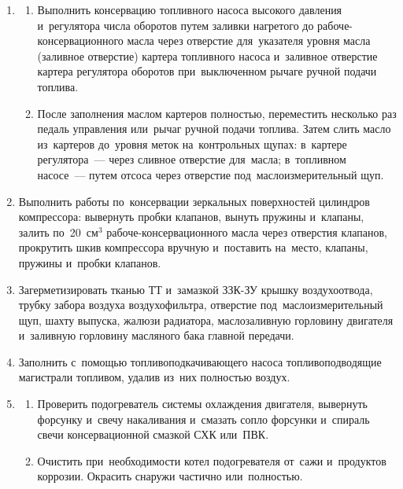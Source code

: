 \begin{enumerate}
\begin{enumerate}
        \item 
        Провернуть стартером коленчатый вал двигателя ( включения по ~сек, с~интервалом ~сек) и~установить на~место форсунки. 
    \end{enumerate}

    \item \begin{enumerate}
        \item 
        Выполнить консервацию топливного насоса высокого давления и~регулятора числа оборотов путем заливки нагретого до \celc{} рабоче-консервационного масла через отверстие для~указателя уровня масла (заливное отверстие) картера топливного насоса и~заливное отверстие картера регулятора оборотов при~выключенном рычаге ручной подачи топлива. 
        \item 
        После заполнения маслом картеров полностью, переместить несколько раз педаль управления или~рычаг ручной подачи топлива. Затем слить масло из~картеров до~уровня меток на~контрольных щупах: в~картере регулятора~--- через сливное отверстие для~масла; в~топливном насосе~--- путем отсоса через отверстие под~маслоизмерительный щуп. 
    \end{enumerate}

    \item
    Выполнить работы по~консервации зеркальных поверхностей цилиндров компрессора: вывернуть пробки клапанов, вынуть пружины и~клапаны, залить по~20~см$^3$ рабоче-консервационного масла через отверстия клапанов, прокрутить шкив компрессора вручную и~поставить на~место, клапаны, пружины и~пробки клапанов. 

    \item
    Загерметизировать тканью ТТ и~замазкой ЗЗК-ЗУ крышку воздухоотвода, трубку забора воздуха воздухофильтра, отверстие под~маслоизмерительный щуп, шахту выпуска, жалюзи радиатора, маслозаливную горловину двигателя и~заливную горловину масляного бака главной передачи.

    \item
    Заполнить с~помощью топливоподкачивающего насоса топливоподводящие магистрали топливом, удалив из~них полностью воздух. 

    \item \begin{enumerate}
        \item 
        Проверить подогреватель системы охлаждения двигателя, вывернуть форсунку и~свечу накаливания и~смазать сопло форсунки и~спираль свечи консервационной смазкой СХК или~ПВК. 
        \item 
        Очистить при~необходимости котел подогревателя от~сажи и~продуктов коррозии. Окрасить снаружи частично или~полностью. 
    \end{enumerate}


\end{enumerate}
